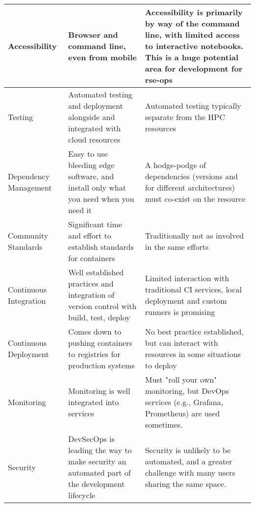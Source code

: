\begin{minipage}{\linewidth}
\begin{center}
\begin{tabular}{| p{15em}  p{15em}  p{15em}|}
Accessibility & Browser and command line, even from mobile & Accessibility is primarily by way of the command line, with limited access to interactive notebooks. This is a huge potential area for development for rse-ops \\
 \hline

Testing & Automated testing and deployment alongside and integrated with cloud resources & Automated testing typically separate from the HPC resources \\

 \hline
Dependency Management & Easy to use bleeding edge software, and install only what you need when you need it & A hodge-podge of dependencies (versions and for different architectures) must co-exist on the resource \\

 \hline
Community Standards & Significant time and effort to establish standards for containers & Traditionally not as involved in the same efforts \\
 \hline

Continuous Integration & Well established practices and integration of version control with build, test, deploy & Limited interaction with traditional CI services, local deployment and custom runners is promising \\
 \hline

Continuous Deployment & Comes down to pushing containers to registries for production systems & No best practice established, but can interact with resources in some situations to deploy\\
 \hline

Monitoring & Monitoring is well integrated into services & Must "roll your own" monitoring, but DevOps services (e.g., Grafana, Prometheus) are used sometimes. \\
 \hline
Security & DevSecOps is leading the way to make security an automated part of the development lifecycle & Security is unlikely to be automated, and a greater challenge with many users sharing the same space. \\ [1ex] 
 \hline
\end{tabular}
\end{center}
\end{minipage}
\restoregeometry
{}




